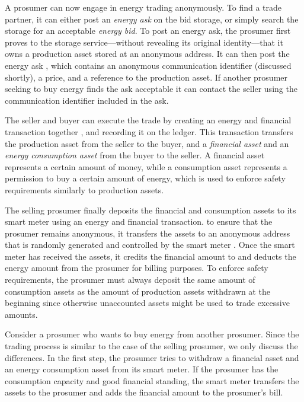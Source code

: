 A prosumer can now engage in energy trading anonymously.  To find a
trade partner, it can either post an \emph{energy ask} on the bid
storage, or simply search the storage for an acceptable \emph{energy
  bid}.  To post an energy ask, the prosumer first proves to the
storage service---without revealing its original identity---that it
owns a production asset stored at an anonymous address.  It can then
post the energy ask , which contains an anonymous
communication identifier (discussed shortly), a price, and a reference
to the production asset.  If another prosumer seeking to buy energy
finds the ask acceptable it can contact the seller using the
communication identifier included in the ask.

The seller and buyer can execute the trade by creating an energy and
financial transaction together , and recording it on the
ledger.  This transaction transfers the production asset from the
seller to the buyer, and a \emph{financial asset} and an \emph{energy
  consumption asset} from the buyer to the seller.  A financial asset
represents a certain amount of money, while a consumption asset
represents a permission to buy a certain amount of energy, which is
used to enforce safety requirements similarly to production assets.

The selling prosumer finally deposits the financial and consumption
assets to its smart meter using an energy and financial transaction.
to ensure that the prosumer remains anonymous, it transfers the assets
to an anonymous address that is randomly generated and controlled by
the smart meter .  Once the smart meter has received the
assets, it credits the financial amount to and deducts the energy
amount from the prosumer for billing purposes.  To enforce safety
requirements, the prosumer must always deposit the same amount of
consumption assets as the amount of production assets withdrawn at the
beginning since otherwise unaccounted assets might be used to trade
excessive amounts.

Consider a prosumer who wants to buy energy from another prosumer.
Since the trading process is similar to the case of the selling
prosumer, we only discuss the differences.  In the first step, the
prosumer tries to withdraw a financial asset and an energy consumption
asset from its smart meter.  If the prosumer has the consumption
capacity and good financial standing, the smart meter transfers the
assets to the prosumer and adds the financial amount to the prosumer's
bill.  

